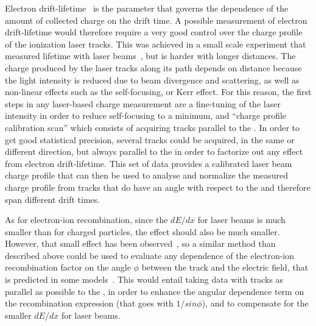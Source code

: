 Electron drift-lifetime~\cite{bib:uBlifetime, Antonello:2014eha} is the parameter that governs the dependence of the amount of collected charge on the drift time. A possible measurement of electron drift-lifetime would therefore require a very good control over the charge profile of the ionization laser tracks. This was achieved in a small scale experiment that measured lifetime with laser beams~\cite{Ereditato:2013xaa}, but is harder with longer distances. The charge produced by the laser tracks along its path depends on distance because the light intensity is reduced due to beam divergence and scattering, as well as non-linear effects such as the self-focusing, or Kerr effect. For this reason, the first steps in any laser-based charge measurement are a fine-tuning of the laser intensity in order to reduce self-focusing to a minimum, and ``charge profile calibration scan'' which consists of acquiring tracks parallel to the . In order to get good statistical precision, several tracks could be acquired, in the same or different direction, but always parallel to the  in order to factorize out any effect from electron drift-lifetime. This set of data provides a calibrated laser beam charge profile that can then be used to analyse and normalize the measured charge profile from tracks that do have an angle with respect to the  and therefore span different drift times.

As for electron-ion recombination, since the $dE/dx$ for laser beams is much smaller than for charged particles, the effect should also be much smaller. However, that small effect has been observed~\cite{Badhrees:2010zz}, so a similar method than described above could be used to evaluate any dependence of the electron-ion recombination factor on the angle $\phi$ between the track and the electric field, that is predicted in some models~\cite{Acciarri:2013met}. This would entail taking data with tracks as parallel as possible to the \efield, in order to enhance the angular dependence term on the recombination expression (that goes with $1/sin \phi$), and to compensate for the smaller $dE/dx$ for laser beams.



